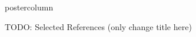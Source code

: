 \documentclass{beamer}
\begin{document}
\begin{frame}
\begin{columns}
\begin{column}{.57\textwidth}
\begin{beamercolorbox}[center]{postercolumn}
\begin{minipage}{.98\textwidth}
{%
\begin{myblock}{TODO: Selected References (only change title here)}
\footnotesize


\end{myblock}\vfill

}\end{minipage}\end{beamercolorbox}
\end{column}

\end{columns}
\end{frame}
\end{document}
